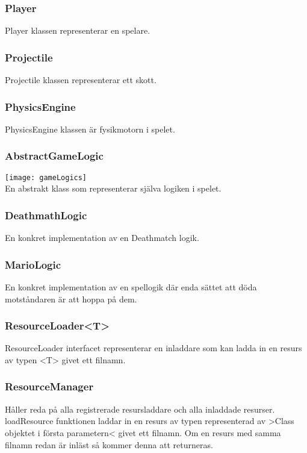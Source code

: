 \subsubsection{Player}
Player klassen representerar en spelare.\\
\subsubsection{Projectile}
Projectile klassen representerar ett skott.\\
\subsubsection{PhysicsEngine}
PhysicsEngine klassen är fysikmotorn i spelet.\\
\subsubsection{AbstractGameLogic}
\texttt{[image: gameLogics]}\\
En abstrakt klass som representerar själva logiken i spelet.\\
\subsubsection{DeathmathLogic}
En konkret implementation av en Deathmatch logik.\\
\subsubsection{MarioLogic}
En konkret implementation av en spellogik där enda sättet att döda motståndaren är att hoppa på dem.\\
\subsubsection{ResourceLoader<T>}
ResourceLoader interfacet representerar en inladdare som kan ladda in en resurs av typen <T> givet ett filnamn.\\
\subsubsection{ResourceManager}
Håller reda på alla registrerade resursladdare och alla inladdade resurser.\\
loadResource funktionen laddar in en resurs av typen representerad av >Class objektet i första parametern< givet ett filnamn. Om en resurs med samma filnamn redan är inläst så kommer denna att returneras.\\
